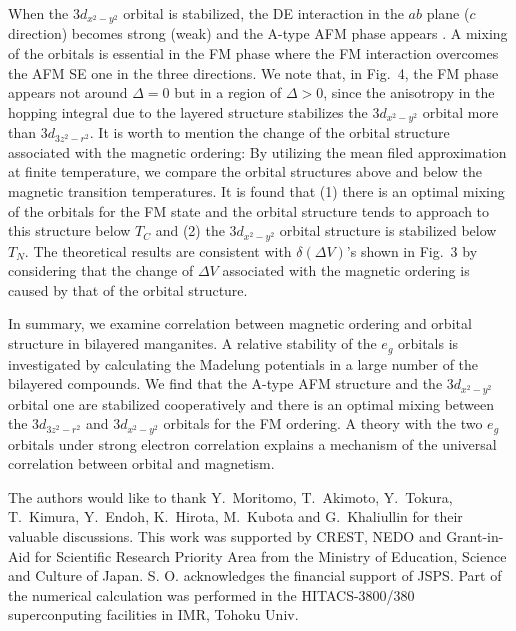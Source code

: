 When the $3d_{x^2-y^2}$ orbital is stabilized,  
the DE interaction in the $ab$ plane ($c$ direction) becomes strong (weak)  
and the A-type AFM phase appears \cite{maezono1}. 
A mixing of the orbitals is essential in the FM phase 
where the FM interaction overcomes the AFM SE one in the three directions. 
%
We note that, in Fig.~4, the FM phase appears not around $\Delta=0$ 
but in a region of $\Delta>0$,  
since the anisotropy in the hopping integral due to the layered structure 
stabilizes the $3d_{x^2-y^2}$ orbital more than $3d_{3z^2-r^2}$. 
%
%
%
It is worth to mention the change of the orbital structure associated with 
the magnetic ordering: 
By utilizing the mean filed approximation at finite temperature, 
we compare the orbital structures above and below the magnetic 
transition temperatures. 
It is found that (1) 
%
there is an optimal mixing of the orbitals for the FM state 
and the orbital structure tends to approach to this structure below $T_C$ 
and 
(2) the $3d_{x^2-y^2}$ orbital structure is stabilized below $T_N$. 
%
The theoretical results are consistent with $\delta (\Delta V)$'s shown in Fig.~3 
by considering that the change of $\Delta V$ 
associated with the magnetic ordering is caused by that of the orbital structure. 
%
\par
%
%
%
In summary, 
we examine correlation between magnetic ordering and orbital structure 
in bilayered manganites. 
A relative stability of the $e_g$ orbitals is 
investigated by calculating 
the Madelung potentials   
in a large number of the bilayered compounds. 
%
We find that 
the A-type AFM structure and 
the $3d_{x^2-y^2}$ orbital one are stabilized cooperatively 
and there is 
an optimal mixing between the $3d_{3z^2-r^2}$ and $3d_{x^2-y^2}$ orbitals for the FM ordering. 
%
A theory with the two $e_g$ orbitals under strong electron correlation 
explains a mechanism of the universal correlation between orbital and magnetism. 
%
%
\par
%
The authors would like to thank Y.~Moritomo, T.~Akimoto, Y.~Tokura, 
T.~Kimura, Y.~Endoh, K.~Hirota, M.~Kubota and G.~Khaliullin for their valuable discussions. 
%
This work was supported by CREST, NEDO 
and Grant-in-Aid for Scientific Research Priority Area 
from the Ministry of Education, Science and Culture of Japan.  
S. O. acknowledges the financial support of JSPS.  
%
Part of the numerical calculation was performed in the HITACS-3800/380 
superconputing facilities in IMR, Tohoku Univ.
%
